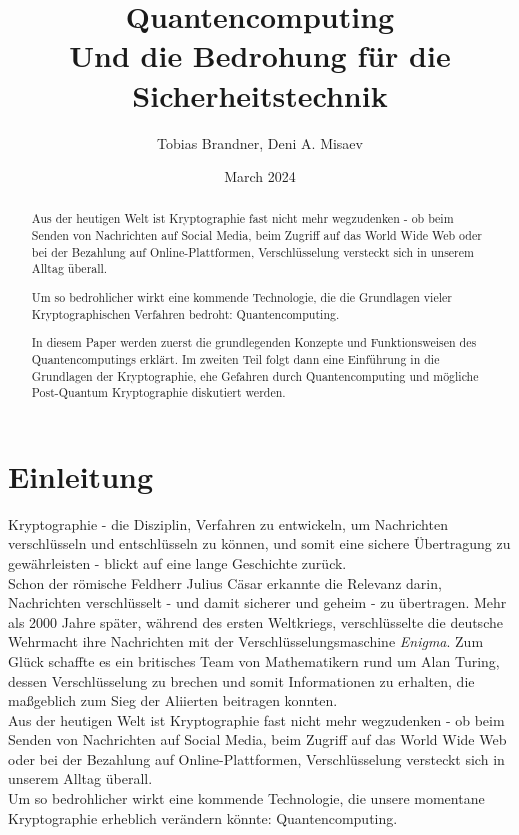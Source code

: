 \documentclass[12pt]{article}
\title{\Huge Quantencomputing \\
\LARGE Und die Bedrohung für die Sicherheitstechnik}
\author{Tobias Brandner, Deni A. Misaev}
\date{March 2024}
\begin{document}
\maketitle

\begin{abstract}
\centering
Aus der heutigen Welt ist Kryptographie fast nicht mehr wegzudenken - ob beim Senden von Nachrichten auf Social Media, beim Zugriff auf das World Wide Web oder bei der Bezahlung auf Online-Plattformen, Verschlüsselung versteckt sich in unserem Alltag überall.

Um so bedrohlicher wirkt eine kommende Technologie, die die Grundlagen vieler Kryptographischen Verfahren bedroht: Quantencomputing.

In diesem Paper werden zuerst die grundlegenden Konzepte und Funktionsweisen des Quantencomputings erklärt. Im zweiten Teil folgt dann eine Einführung in die Grundlagen der Kryptographie, ehe Gefahren durch Quantencomputing und mögliche Post-Quantum Kryptographie diskutiert werden.
\end{abstract}

\tableofcontents

\clearpage
\section{Einleitung}

Kryptographie - die Disziplin, Verfahren zu entwickeln, um Nachrichten verschlüsseln und entschlüsseln zu können, und somit eine sichere Übertragung zu gewährleisten - blickt auf eine lange Geschichte zurück. \\

Schon der römische Feldherr Julius Cäsar erkannte die Relevanz darin, Nachrichten verschlüsselt - und damit sicherer und geheim - zu übertragen. \cite{Uhl2022Krypto} Mehr als 2000 Jahre später, während des ersten Weltkriegs, verschlüsselte die deutsche Wehrmacht ihre Nachrichten mit der Verschlüsselungsmaschine \textit{Enigma}. Zum Glück schaffte es ein britisches Team von Mathematikern rund um Alan Turing, dessen Verschlüsselung zu brechen und somit Informationen zu erhalten, die maßgeblich zum Sieg der Aliierten beitragen konnten. \cite{Enigma} \\

Aus der heutigen Welt ist Kryptographie fast nicht mehr wegzudenken - ob beim Senden von Nachrichten auf Social Media, beim Zugriff auf das World Wide Web oder bei der Bezahlung auf Online-Plattformen, Verschlüsselung versteckt sich in unserem Alltag überall.\\
Um so bedrohlicher wirkt eine kommende Technologie, die unsere momentane Kryptographie erheblich verändern könnte: Quantencomputing.\\
\end{document}
